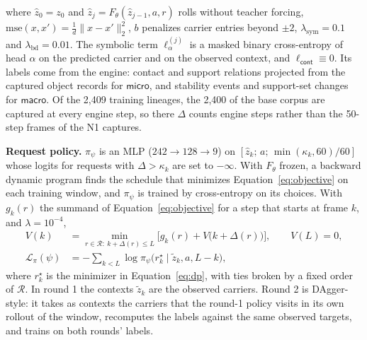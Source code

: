where $\hat z_0=z_0$ and $\hat z_j=F_\theta(\hat z_{j-1},a,r)$ rolls without teacher forcing, $\mathrm{mse}(x,x')=\tfrac1d\lVert x-x'\rVert_2^2$, $b$ penalizes carrier entries beyond $\pm2$, $\lambda_{\mathrm{sym}}=0.1$ and $\lambda_{\mathrm{bd}}=0.01$. The symbolic term $\ell_\alpha^{(j)}$ is a masked binary cross-entropy of head $\alpha$ on the predicted carrier and on the observed context, and $\ell_{\textsf{cont}}\equiv0$. Its labels come from the engine: contact and support relations projected from the captured object records for $\textsf{micro}$, and stability events and support-set changes for $\textsf{macro}$. Of the 2,409 training lineages, the 2,400 of the base corpus are captured at every engine step, so there $\Delta$ counts engine steps rather than the 50-step frames of the N1 captures.

\textbf{Request policy.} $\pi_\psi$ is an MLP ($242\to128\to9$) on $[\hat z_k;\,a;\,\min(\kappa_k,60)/60]$ whose logits for requests with $\Delta>\kappa_k$ are set to $-\infty$. With $F_\theta$ frozen, a backward dynamic program finds the schedule that minimizes Equation~\ref{eq:objective} on each training window, and $\pi_\psi$ is trained by cross-entropy on its choices. With $g_k(r)$ the summand of Equation~\ref{eq:objective} for a step that starts at frame $k$, and $\lambda=10^{-4}$,
\begin{align}
V(k)&=\min_{r\in\mathcal{R}:\ k+\Delta(r)\le L}\Big[g_k(r)+V\big(k+\Delta(r)\big)\Big],\qquad V(L)=0,
\label{eq:dp}\\
\mathcal{L}_\pi(\psi)&=-\sum_{k<L}\log\pi_\psi\big(r^{\star}_k\mid\tilde z_k,a,L-k\big),
\label{eq:distill}
\end{align}
where $r^{\star}_k$ is the minimizer in Equation~\ref{eq:dp}, with ties broken by a fixed order of $\mathcal{R}$. In round 1 the contexts $\tilde z_k$ are the observed carriers. Round 2 is DAgger-style: it takes as contexts the carriers that the round-1 policy visits in its own rollout of the window, recomputes the labels against the same observed targets, and trains on both rounds' labels.


